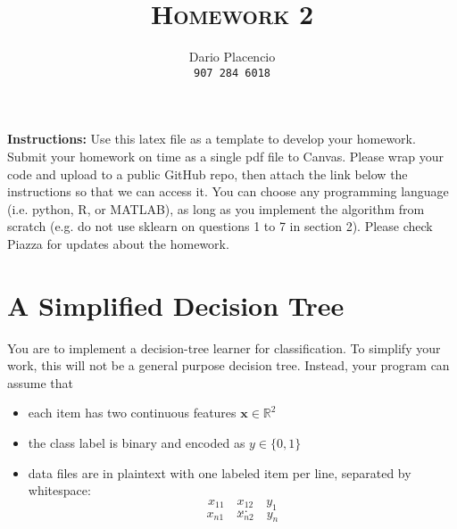 \documentclass[a4paper]{article}
\title{\textsc{Homework 2}} %
\author{Dario Placencio\\
\texttt{907 284 6018}}
\date{}
\theoremstyle{definition}
\newcommand{\RR}{\mathbb{R}}
\def\x{\mathbf x}
\begin{document}
\maketitle 

\textbf{Instructions:} 
Use this latex file as a template to develop your homework. Submit your homework on time as a single pdf file to Canvas. Please wrap your code and upload to a public GitHub repo, then attach the link below the instructions so that we can access it. You can choose any programming language (i.e. python, R, or MATLAB), as long as you implement the algorithm from scratch (e.g. do not use sklearn on questions 1 to 7 in section 2). Please check Piazza for updates about the homework.

\begin{itemize}
  \item The Jupyter Noteebok userd for this homework can be found on this link: \url{
\end{itemize}

\section{A Simplified Decision Tree}
You are to implement a decision-tree learner for classification.
To simplify your work, this will not be a general purpose decision tree.  Instead, your program can assume that
\begin{itemize}
\item each item has two continuous features $\x \in \RR^2$
\item the class label is binary and encoded as $y \in \{0,1\}$
\item data files are in plaintext with one labeled item per line, separated by whitespace:
$$x_{11} \quad x_{12} \quad y_1$$
$$...$$
$$x_{n1} \quad x_{n2} \quad y_n$$
\end{itemize}
\end{document}
